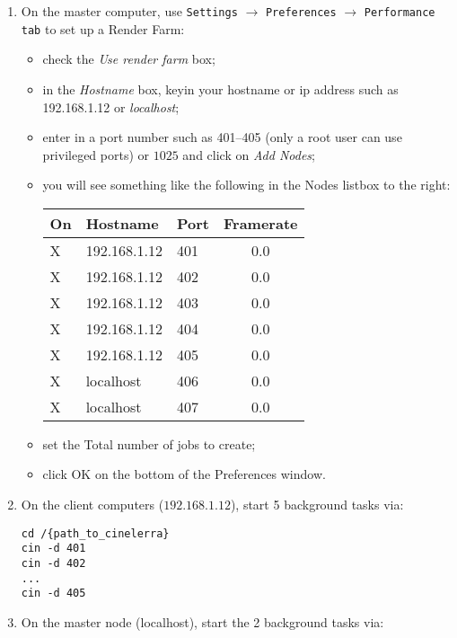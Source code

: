 \begin{enumerate}
    \item On the master computer, use \texttt{Settings} $\rightarrow$ \texttt{Preferences} $\rightarrow$ \texttt{Performance} \texttt{tab} to set up a Render Farm:
    \begin{itemize}
        \item check the \textit{Use render farm} box;
        \item in the \textit{Hostname} box, keyin your hostname or ip address such as 192.168.1.12 or \textit{localhost};
        \item enter in a port number such as 401--405 (only a root user can use privileged ports) or $1025$  and click on \textit{Add Nodes};
        \item you will see something like the following in the Nodes listbox to the right:\newline
            \begin{tabular}{lllc}
                On & Hostname     & Port & Framerate \\\midrule
                X  & 192.168.1.12 & 401  & 0.0       \\
                X  & 192.168.1.12 & 402  & 0.0       \\
                X  & 192.168.1.12 & 403  & 0.0       \\
                X  & 192.168.1.12 & 404  & 0.0       \\
                X  & 192.168.1.12 & 405  & 0.0       \\
                X  & localhost    & 406  & 0.0       \\
                X  & localhost    & 407  & 0.0       \\
            \end{tabular}
        \item set the Total number of jobs to create;
        \item click OK on the bottom of the Preferences window.
    \end{itemize}
    \item On the client computers ($192.168.1.12$), start 5 background \CGG{} tasks via:
    \begin{lstlisting}[style=sh]
cd /{path_to_cinelerra}
cin -d 401
cin -d 402
...
cin -d 405
    \end{lstlisting}
    \item On the master node (localhost), start the 2 background \CGG{} tasks via:
    \begin{lstlisting}[style=sh]

\end{lstlisting}
\end{enumerate}
